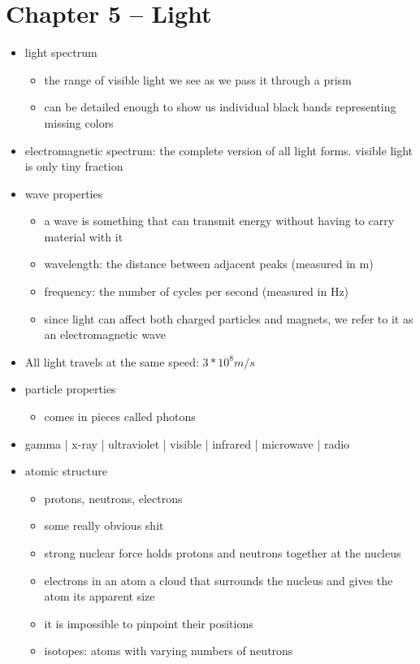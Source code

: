 \documentclass[12pt]{article}
\begin{document}
\section{Chapter 5 -- Light}
\begin{itemize}
\item light spectrum
\begin{itemize}
\item the range of visible light we see as we pass it through a prism
\item can be detailed enough to show us individual black bands representing missing colors
\end{itemize}
\item electromagnetic spectrum: the complete version of all light forms. visible light is only tiny fraction
\item wave properties
\begin{itemize}
\item a wave is something that can transmit energy without having to carry material with it
\item wavelength: the distance between adjacent peaks (measured in m)
\item frequency: the number of cycles per second (measured in Hz)
\item since light can affect both charged particles and magnets, we refer to it as an electromagnetic wave
\end{itemize}
\item All light travels at the same speed: $3*10^8 m/s$
\item particle properties
\begin{itemize}
\item comes in pieces called photons
\end{itemize}
\item gamma | x-ray | ultraviolet | visible | infrared | microwave | radio
\item atomic structure
\begin{itemize}
\item protons, neutrons, electrons
\item some really obvious shit
\item strong nuclear force holds protons and neutrons together at the nucleus
\item electrons in an atom a cloud that surrounds the nucleus and gives the atom its apparent size
\item it is impossible to pinpoint their positions
\item isotopes: atoms with varying numbers of neutrons

\end{itemize}
\end{itemize}
\end{document}
